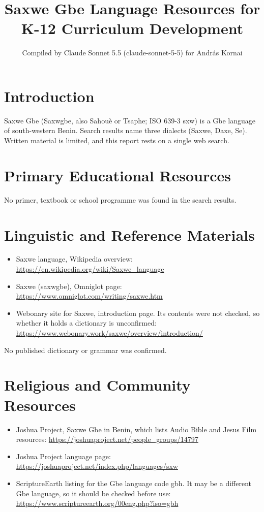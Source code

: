 \documentclass[12pt]{article}
\title{Saxwe Gbe Language Resources for K-12 Curriculum Development}
\author{Compiled by Claude Sonnet 5.5 (claude-sonnet-5-5) for Andr\'as Kornai}
\date{}
\begin{document}
\maketitle

\section{Introduction}
Saxwe Gbe (Saxw\textepsilon{}gbe, also Sahou\`e or Tsaphe; ISO 639-3 sxw) is a Gbe language of south-western Benin. Search results name three dialects (Saxwe, Daxe, Se). Written material is limited, and this report rests on a single web search.

\section{Primary Educational Resources}
No primer, textbook or school programme was found in the search results.

\section{Linguistic and Reference Materials}
\begin{itemize}
\item Saxwe language, Wikipedia overview: \url{https://en.wikipedia.org/wiki/Saxwe_language}
\item Saxwe (saxw\textepsilon{}gbe), Omniglot page: \url{https://www.omniglot.com/writing/saxwe.htm}
\item Webonary site for Saxwe, introduction page. Its contents were not checked, so whether it holds a dictionary is unconfirmed: \url{https://www.webonary.work/saxwe/overview/introduction/}
\end{itemize}
No published dictionary or grammar was confirmed.

\section{Religious and Community Resources}
\begin{itemize}
\item Joshua Project, Saxwe Gbe in Benin, which lists Audio Bible and Jesus Film resources: \url{https://joshuaproject.net/people_groups/14797}
\item Joshua Project language page: \url{https://joshuaproject.net/index.php/languages/sxw}
\item ScriptureEarth listing for the Gbe language code gbh. It may be a different Gbe language, so it should be checked before use: \url{https://www.scriptureearth.org/00eng.php?iso=gbh}
\end{itemize}
\end{document}
